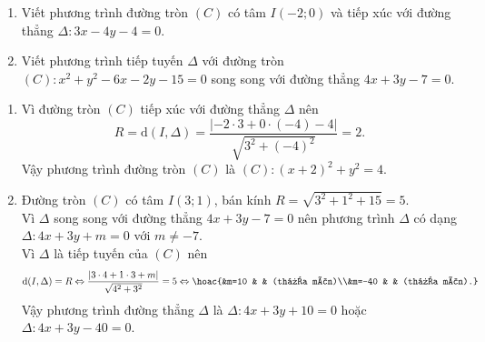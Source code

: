 \begin{bt}%
\begin{enumerate}
\item Viết phương trình đường tròn $(C)$ có tâm $I(-2;0)$ và tiếp xúc với đường thẳng $\Delta \colon 3x-4y-4=0$.
\item Viết phương trình tiếp tuyến $\Delta$ với đường tròn $(C)\colon x^2+y^2-6x-2y-15=0$ song song với đường thẳng $4x+3y-7=0$.
\end{enumerate}
\loigiai
{
\begin{enumerate}
\item Vì đường tròn $(C)$ tiếp xúc với đường thẳng $\Delta$ nên
$$R=\mathrm{d}(I,\Delta)=\dfrac{|-2\cdot3+0\cdot(-4)-4|}{\sqrt{3^2+(-4)^2}}=2.$$
Vậy phương trình đường tròn $(C)$ là $(C)\colon (x+2)^2+y^2=4$.
\item Đường tròn $(C)$ có tâm $I(3;1)$, bán kính $R=\sqrt{3^2+1^2+15}=5$.\\
Vì $\Delta$ song song với đường thẳng $4x+3y-7=0$ nên phương trình $\Delta$ có dạng $\Delta\colon 4x+3y+m=0$ với $m\ne -7$.\\
Vì $\Delta$ là tiếp tuyến của $(C)$ nên
$$\mathrm{d}(I,\Delta)=R\Leftrightarrow \dfrac{|3\cdot 4+1\cdot 3+m|}{\sqrt{4^2+3^2}}=5\Leftrightarrow\hoac{&m=10 & & (thỏa mãn)\\&m=-40  & & (thỏa mãn).}$$
Vậy phương trình đường thẳng $\Delta$ là $\Delta\colon 4x+3y+10=0$ hoặc $\Delta\colon 4x+3y-40=0$.
\end{enumerate}
}
\end{bt}

